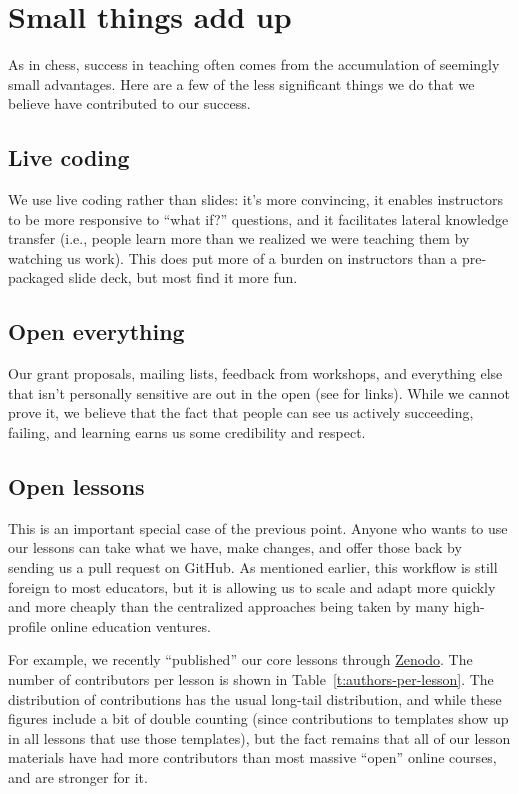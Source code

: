 \documentclass[10pt,a4paper,twocolumn]{article}
\begin{document}
\section*{Small things add up}

As in chess, success in teaching often comes from the accumulation of
seemingly small advantages. Here are a few of the less significant
things we do that we believe have contributed to our success.

\subsection*{Live coding}

We use live coding rather than slides: it's more convincing, it enables
instructors to be more responsive to ``what if?'' questions, and it
facilitates lateral knowledge transfer (i.e., people learn more than we
realized we were teaching them by watching us work). This does put more
of a burden on instructors than a pre-packaged slide deck, but most find
it more fun.

\subsection*{Open everything}

Our grant proposals, mailing lists, feedback from workshops, and
everything else that isn't personally sensitive are out in the open
(see \cite{swcsite} for links).  While we cannot prove it, we believe
that the fact that people can see us actively succeeding, failing, and
learning earns us some credibility and respect.

\subsection*{Open lessons}

This is an important special case of the previous point. Anyone who
wants to use our lessons can take what we have, make changes, and offer
those back by sending us a pull request on GitHub. As mentioned earlier,
this workflow is still foreign to most educators, but it is allowing us
to scale and adapt more quickly and more cheaply than the centralized
approaches being taken by many high-profile online education ventures.

For example, we recently ``published'' our core lessons through
\href{https://zenodo.org/}{Zenodo}.  The number of contributors per
lesson is shown in Table~\ref{t:authors-per-lesson}.  The distribution
of contributions has the usual long-tail distribution, and while these
figures include a bit of double counting (since contributions to
templates show up in all lessons that use those templates), but the
fact remains that all of our lesson materials have had more
contributors than most massive ``open'' online courses, and are
stronger for it.
\end{document}
